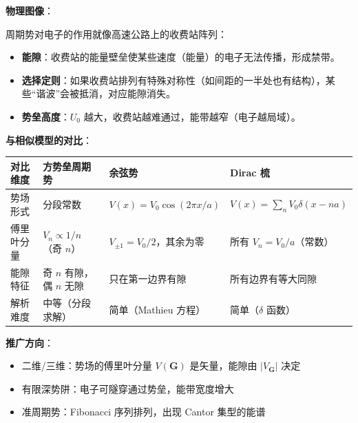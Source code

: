 \begin{insightbox}[物理图像与模型关联]
\textbf{物理图像}：

周期势对电子的作用就像高速公路上的收费站阵列：
\begin{itemize}[nosep]
    \item \textbf{能隙}：收费站的能量壁垒使某些速度（能量）的电子无法传播，形成禁带。
    \item \textbf{选择定则}：如果收费站排列有特殊对称性（如间距的一半处也有结构），某些``谐波''会被抵消，对应能隙消失。
    \item \textbf{势垒高度}：$U_0$ 越大，收费站越难通过，能带越窄（电子越局域）。
\end{itemize}

\textbf{与相似模型的对比}：
\begin{center}
\begin{tabular}{llll}
\toprule
\textbf{对比维度} & \textbf{方势垒周期势} & \textbf{余弦势} & \textbf{Dirac 梳} \\
\midrule
势场形式 & 分段常数 & $V(x)=V_0\cos(2\pi x/a)$ & $V(x)=\sum_n V_0\delta(x-na)$ \\
傅里叶分量 & $V_n\propto 1/n$（奇 $n$） & $V_{\pm1}=V_0/2$，其余为零 & 所有 $V_n=V_0/a$（常数） \\
能隙特征 & 奇 $n$ 有隙，偶 $n$ 无隙 & 只在第一边界有隙 & 所有边界有等大同隙 \\
解析难度 & 中等（分段求解） & 简单（Mathieu 方程） & 简单（$\delta$ 函数） \\
\bottomrule
\end{tabular}
\end{center}

\textbf{推广方向}：
\begin{itemize}[nosep]
    \item 二维/三维：势场的傅里叶分量 $V(\mathbf{G})$ 是矢量，能隙由 $|V_{\mathbf{G}}|$ 决定
    \item 有限深势阱：电子可隧穿通过势垒，能带宽度增大
    \item 准周期势：Fibonacci 序列排列，出现 Cantor 集型的能谱
\end{itemize}
\end{insightbox}

